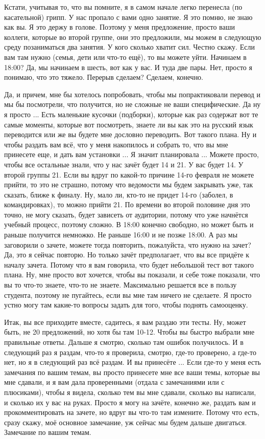 \documentclass[main.tex]{subfiles}
\begin{document}
\newpage
{}

Кстати, учитывая то, что вы помните, я в самом начале легко перенесла (по касательной) грипп.
У нас пропало с вами одно занятие.
Я это помню, не знаю как вы.
Я это держу в голове.
Поэтому у меня предложение, просто ваши коллеги, которые во второй группе, они это предложили, мы можем в следующую среду позаниматься два занятия.
У кого сколько хватит сил.
Честно скажу.
Если вам там нужно (семья, дети или что-то ещё), то вы можете уйти.
Начинаем в 18:00?
Да, мы начинаем в шесть, вот как у вас.
И туда две пары.
Нет, просто я понимаю, что это тяжело.
Перерыв сделаем?
Сделаем, конечно.

Да, и причем, мне бы хотелось попробовать, чтобы мы попрактиковали перевод и мы бы посмотрели, что получится, но не сложные не ваши специфические.
Да ну я просто ...
Есть маленькие кусочки (подборки), которые как раз содержат вот те самые моменты, которые вот посмотреть, знаете ли вы как это на русский язык переводится или же вы будете мне дословно переводить.
Вот такого плана.
Ну и чтобы раздать вам всё, что у меня накопилось и собрать то, что вы мне принесете еще, и дать вам установки ...
Я значит планировала ...
Можете просто, чтобы все остальные знали, что у нас зачёт будет 14 и 21.
У вас будет 14.
У второй группы 21.
Если вы вдруг по какой-то причине 14-го февраля не можете прийти, то это не страшно, потому что ведомости мы будем закрывать уже, так сказать, ближе к финалу.
Ну, мало ли, кто-то не придет 14-го (заболел, в командировках), то можно прийти 21.
По времени во второй половине дня это точно, не могу сказать, будет зависеть от аудитории, потому что уже начнётся учебный процесс, поэтому сложно.
В 18:00 конечно свободно, но может быть и раньше получится немножко.
Не раньше 16:00 и не позже 18:00.
А раз мы заговорили о зачете, можете тогда повторить, пожалуйста, что нужно на зачет?
Да, это я сейчас повторю.
Но только зачёт предполагает, что вы все придёте к началу зачета.
Потому что я вам говорила, что будет небольшой тест вот такого плана.
Ну, мне просто вот хочется, чтобы вы показали, и себе тоже показали, что вы то что-то знаете, что-то не знаете.
Максимально решается все в пользу студента, поэтому не пугайтесь, если вы мне там ничего не сделаете.
Я просто устно могу там какие-то вопросы задать для того, чтобы поднять самооценку.

Итак, вы все приходите вместе, садитесь, я вам раздаю эти тесты.
Ну, может быть, не 20 предложений, но хотя бы там 10-12.
Чтобы вы быстро выбрали мне правильные ответы.
Дальше я смотрю, сколько там ошибок получилось.
И в следующий раз я раздам, что-то я проверила, смотрю, где-то проверено, а где-то нет, но я в следующий раз всё раздам.
И вы принесёте ...
Если где-то у меня есть замечания по вашим темам, вы просто принесете мне все ваши темы, которые вы мне сдавали, и я вам дала проверенными (отдала с замечаниями или с плюсиками), чтобы я видела, сколько тем вы мне сдавали, сколько вы написали, и сколько их у вас на руках.
Просто я могу на зачёте, конечно же, раздать вам и прокомментировать на зачете, но вдруг вы что-то там измените.
Потому что есть, сразу скажу, моё основное замечание, уж сейчас мы будем дальше двигаться.
Замечание по вашим темам.
\end{document}
